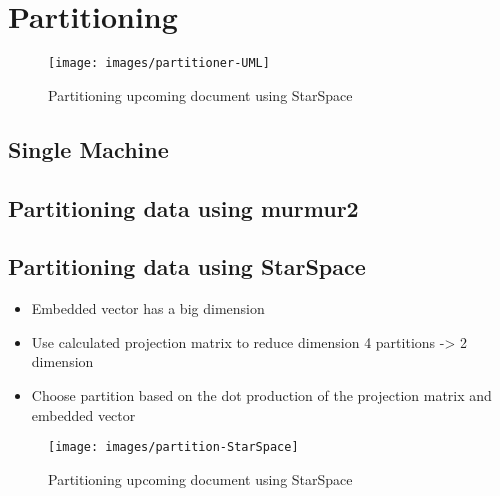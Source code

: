 \section{Partitioning}
\label{sec:partitioning}

\begin{figure}[!h]
	\centering
	\texttt{[image: images/partitioner-UML]}
	\caption{Partitioning upcoming document using StarSpace}
	\label{fig:partitioner-uml}
\end{figure}

\subsection{Single Machine}
\label{subsec:partitioning-single-machine}


\subsection{Partitioning data using murmur2}
\label{subsec:partitioning-murmur2}


\subsection{Partitioning data using StarSpace}
\label{subsec:partitioning-star-space}

\begin{itemize}
    \item Embedded vector has a big dimension

    \item Use calculated projection matrix to reduce dimension
    4 partitions -> 2 dimension
    
    \item Choose partition based on the dot production of the projection matrix and embedded vector
    
\end{itemize}




\begin{figure}[!h]
	\centering
	\texttt{[image: images/partition-StarSpace]}
	\caption{Partitioning upcoming document using StarSpace}
	\label{fig:star-space-partitioning}
\end{figure}
